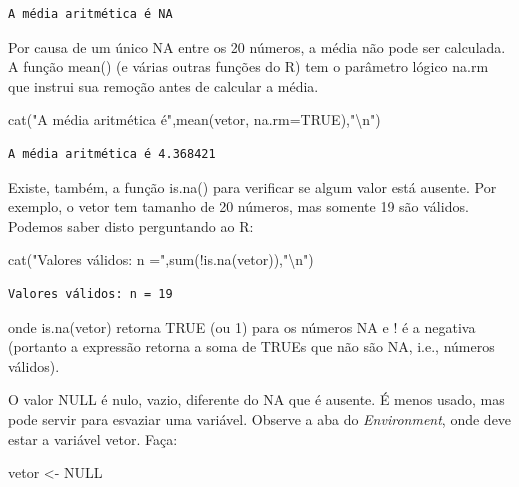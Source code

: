 \documentclass[
]{article}
\newenvironment{Shaded}{\begin{snugshade}}{\end{snugshade}}
\newcommand{\AttributeTok}[1]{\textcolor[rgb]{0.77,0.63,0.00}{#1}}
\newcommand{\ConstantTok}[1]{\textcolor[rgb]{0.00,0.00,0.00}{#1}}
\newcommand{\FunctionTok}[1]{\textcolor[rgb]{0.00,0.00,0.00}{#1}}
\newcommand{\NormalTok}[1]{#1}
\newcommand{\OtherTok}[1]{\textcolor[rgb]{0.56,0.35,0.01}{#1}}
\newcommand{\SpecialCharTok}[1]{\textcolor[rgb]{0.00,0.00,0.00}{#1}}
\newcommand{\StringTok}[1]{\textcolor[rgb]{0.31,0.60,0.02}{#1}}
\begin{document}
\begin{verbatim}
A média aritmética é NA 
\end{verbatim}

Por causa de um único NA entre os 20 números, a média não pode ser
calculada. A função mean() (e várias outras funções do R) tem o
parâmetro lógico na.rm que instrui sua remoção antes de calcular a
média.

\begin{Shaded}
\begin{Highlighting}[]
\FunctionTok{cat}\NormalTok{(}\StringTok{"A média aritmética é"}\NormalTok{,}\FunctionTok{mean}\NormalTok{(vetor, }\AttributeTok{na.rm=}\ConstantTok{TRUE}\NormalTok{),}\StringTok{"}\SpecialCharTok{\textbackslash{}n}\StringTok{"}\NormalTok{)}
\end{Highlighting}
\end{Shaded}

\begin{verbatim}
A média aritmética é 4.368421 
\end{verbatim}

Existe, também, a função is.na() para verificar se algum valor está
ausente. Por exemplo, o vetor tem tamanho de 20 números, mas somente 19
são válidos. Podemos saber disto perguntando ao R:

\begin{Shaded}
\begin{Highlighting}[]
\FunctionTok{cat}\NormalTok{(}\StringTok{"Valores válidos: n ="}\NormalTok{,}\FunctionTok{sum}\NormalTok{(}\SpecialCharTok{!}\FunctionTok{is.na}\NormalTok{(vetor)),}\StringTok{"}\SpecialCharTok{\textbackslash{}n}\StringTok{"}\NormalTok{)}
\end{Highlighting}
\end{Shaded}

\begin{verbatim}
Valores válidos: n = 19 
\end{verbatim}

onde is.na(vetor) retorna TRUE (ou 1) para os números NA e ! é a
negativa (portanto a expressão retorna a soma de TRUEs que não são NA,
i.e., números válidos).

O valor NULL é nulo, vazio, diferente do NA que é ausente. É menos
usado, mas pode servir para esvaziar uma variável. Observe a aba do
\emph{Environment}, onde deve estar a variável vetor. Faça:

\begin{Shaded}
\begin{Highlighting}[]
\NormalTok{vetor }\OtherTok{\textless{}{-}} \ConstantTok{NULL}
\end{Highlighting}
\end{Shaded}
\end{document}

